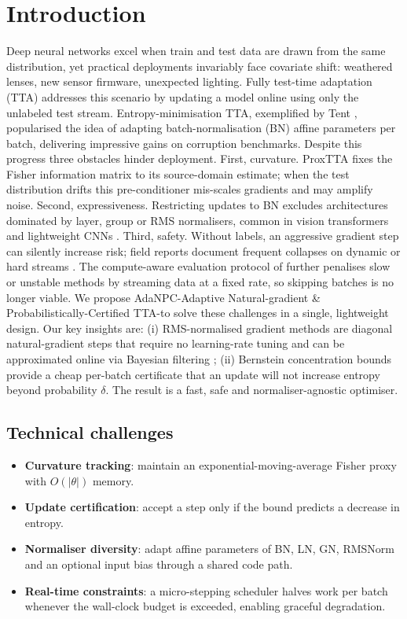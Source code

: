 \documentclass{article} %
\begin{document}
\section{Introduction}
\label{sec:intro}
Deep neural networks excel when train and test data are drawn from the same distribution, yet practical deployments invariably face covariate shift: weathered lenses, new sensor firmware, unexpected lighting. Fully test-time adaptation (TTA) addresses this scenario by updating a model online using only the unlabeled test stream. Entropy-minimisation TTA, exemplified by Tent \cite{wang-2020-tent}, popularised the idea of adapting batch-normalisation (BN) affine parameters per batch, delivering impressive gains on corruption benchmarks. Despite this progress three obstacles hinder deployment.
First, curvature. ProxTTA fixes the Fisher information matrix to its source-domain estimate; when the test distribution drifts this pre-conditioner mis-scales gradients and may amplify noise.
Second, expressiveness. Restricting updates to BN excludes architectures dominated by layer, group or RMS normalisers, common in vision transformers and lightweight CNNs \cite{lim-2023-ttn}.
Third, safety. Without labels, an aggressive gradient step can silently increase risk; field reports document frequent collapses on dynamic or hard streams \cite{niu-2023-towards,yuan-2023-robust}. The compute-aware evaluation protocol of \cite{alfarra-2023-evaluation} further penalises slow or unstable methods by streaming data at a fixed rate, so skipping batches is no longer viable.
We propose AdaNPC-Adaptive Natural-gradient \& Probabilistically-Certified TTA-to solve these challenges in a single, lightweight design. Our key insights are: (i) RMS-normalised gradient methods are diagonal natural-gradient steps that require no learning-rate tuning and can be approximated online via Bayesian filtering \cite{aitchison-2018-bayesian}; (ii) Bernstein concentration bounds provide a cheap per-batch certificate that an update will not increase entropy beyond probability \(\delta\). The result is a fast, safe and normaliser-agnostic optimiser.
\subsection{Technical challenges}
\begin{itemize}
  \item \textbf{Curvature tracking}: maintain an exponential-moving-average Fisher proxy with \(O(|\theta|)\) memory.
  \item \textbf{Update certification}: accept a step only if the bound predicts a decrease in entropy.
  \item \textbf{Normaliser diversity}: adapt affine parameters of BN, LN, GN, RMSNorm and an optional input bias through a shared code path.
  \item \textbf{Real-time constraints}: a micro-stepping scheduler halves work per batch whenever the wall-clock budget is exceeded, enabling graceful degradation.
\end{itemize}
\end{document}
